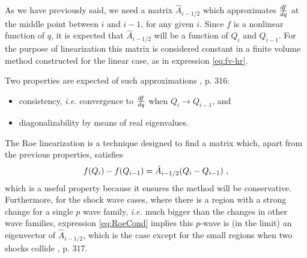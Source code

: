 As we have previously said, we need a matrix $\hat{A}_{i-1/2}$ which approximates $\frac{d f}{d q}$ at the middle point between $i$ and $i-1$, for any given $i$. 
Since $f$ is a nonlinear function of $q$, it is expected that $\hat{A}_{i-1/2}$ will be a function of $Q_i$ and $Q_{i-1}$.
For the purpose of linearization this matrix is considered constant in a finite volume method constructed for the linear case, as in expression \eqref{eq:fv-hr}.

Two properties are expected of such approximations \citep{leveque-book-fv}, p. 316:
\begin{itemize}
\item consistency, {\em i.e.} convergence to $\frac{d f}{d q}$ when $Q_i\rightarrow{}Q_{i-1}$, and
\item diagonalizability by means of real eigenvalues.
\end{itemize}
The Roe linearization is a technique designed to find a matrix which, apart from the previous properties, satisfies
\begin{align}
  \label{eq:RoeCond}
  f(Q_i) -f(Q_{i-1}) = \hat{A}_{i-1/2} (Q_i  - Q_{i-1})
  \ \text{,}
\end{align}
which is a useful property because it ensures the method will be conservative. Furthermore, for the shock wave cases, where there is a region with a strong change for a single $p$ wave family, {\em i.e.} much bigger than the changes in other wave families, expression \eqref{eq:RoeCond} implies this $p$-wave is (in the limit) an eigenvector of $\hat{A}_{i-1/2}$, which is the case except for the small regions when two shocks collide \citep{leveque-book-fv}, p. 317.

